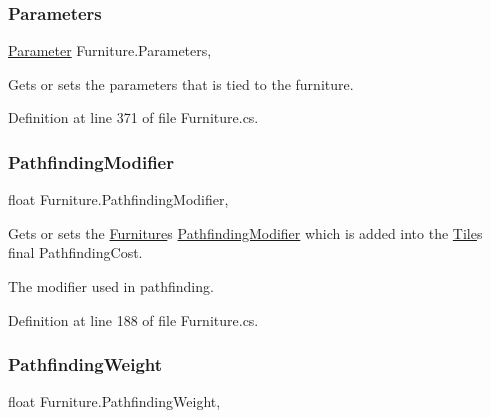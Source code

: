 \subsubsection{\texorpdfstring{Parameters}{Parameters}}
{\footnotesize\ttfamily \hyperlink{class_parameter}{Parameter} Furniture.\+Parameters\hspace{0.3cm}{\ttfamily [get]}, {\ttfamily [set]}}



Gets or sets the parameters that is tied to the furniture. 



Definition at line 371 of file Furniture.\+cs.

\mbox{\label{class_furniture_a6a6f7f0e402f354adf5aa1d3125ef364}} 
\subsubsection{\texorpdfstring{Pathfinding\+Modifier}{PathfindingModifier}}
{\footnotesize\ttfamily float Furniture.\+Pathfinding\+Modifier\hspace{0.3cm}{\ttfamily [get]}, {\ttfamily [set]}}



Gets or sets the \hyperlink{class_furniture}{Furniture}\textquotesingle{}s \hyperlink{class_furniture_a6a6f7f0e402f354adf5aa1d3125ef364}{Pathfinding\+Modifier} which is added into the \hyperlink{class_tile}{Tile}\textquotesingle{}s final Pathfinding\+Cost. 

The modifier used in pathfinding.

Definition at line 188 of file Furniture.\+cs.

\mbox{\label{class_furniture_a8c6a8f93acbcc055d88fe8cee68713d0}} 
\subsubsection{\texorpdfstring{Pathfinding\+Weight}{PathfindingWeight}}
{\footnotesize\ttfamily float Furniture.\+Pathfinding\+Weight\hspace{0.3cm}{\ttfamily [get]}, {\ttfamily [set]}}



